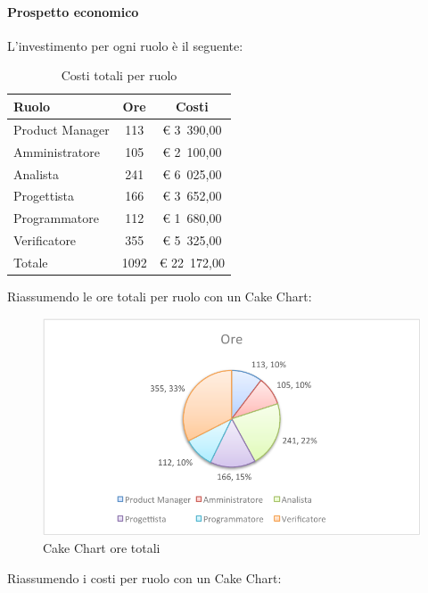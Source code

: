 			\paragraph{Prospetto economico}
				L'investimento per ogni ruolo è il seguente:
				\begin{table}[H]
					\begin{center}
						\begin{tabular}{| l | c | c |}
							\hline
							Ruolo 			& Ore 	& Costi  \\ \hline
							
							Product Manager	& 113 	& \euro{} 3~390,00 	\\
							Amministratore 		& 105 	& \euro{} 2~100,00 	\\
							Analista	 		& 241 	& \euro{} 6~025,00 	\\
							Progettista 		& 166	& \euro{} 3~652,00 	\\
							Programmatore		& 112	& \euro{} 1~680,00	\\
							Verificatore		& 355 	& \euro{} 5~325,00 	\\ \hline \hline
							
							Totale	 		& 1092 	& \euro{} 22~172,00 	\\ \hline
						\end{tabular}
					\end{center}
					\caption{Costi totali per ruolo}
				\end{table}
				Riassumendo le ore totali per ruolo con un Cake Chart:
				\begin{figure}[H]\centering
					\includegraphics[width=\textwidth]{PianoDiProgetto/Pics/ChartTotOre.pdf}
					\caption{Cake Chart ore totali}
				\end{figure}
				Riassumendo i costi per ruolo con un Cake Chart:
